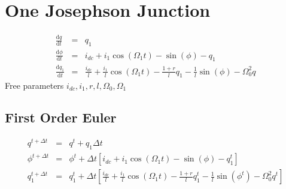 \documentclass[40pt,letterpaper]{article}
\begin{document}
  	\section{One Josephson Junction}
  	\begin{eqnarray}
  	\frac{\text{d}q}{\text{d}t} &=& q_1 \\
  	\frac{\text{d}\phi}{\text{d}t} &=& i_{dc} 
  		+ i_1 \cos(\Omega_{1}t) - \sin(\phi) 
  		- q_1 \\
  	\frac{\text{d}q_1}{\text{d}t} &=&
	\frac{i_{dc}}{l} + 
	\frac{i_1}{l}\cos(\Omega_1 t) 
	- \frac{1 + r}{l}q_1 - \frac{1}{l}\sin(\phi) 
	- \Omega_0^2 q
  	\end{eqnarray}
  	Free parameters $i_{dc}, i_1, r, l, \Omega_0, \Omega_1$
  	\subsection{First Order Euler}
  	\begin{eqnarray}
  	q^{t+\Delta t} &=& q^t + q_1 \Delta t \\
  	\phi^{t+\Delta t} &=& \phi^t + \Delta t
  	\left[
  	i_{dc} + i_1 \cos(\Omega_{1}t) - \sin(\phi) 
  	- q^{t}_1
  	\right] \\
  	q^{t+\Delta t}_1 &=& q^t_1 + \Delta t
  	\left[
	\frac{i_{dc}}{l} + 
	\frac{i_1}{l}\cos(\Omega_1 t) 
	- \frac{1 + r}{l}q^t_1 - \frac{1}{l}\sin(\phi^t) 
	- \Omega_0^2 q^t  	
  	\right]
  	\end{eqnarray}
  	
\end{document}

